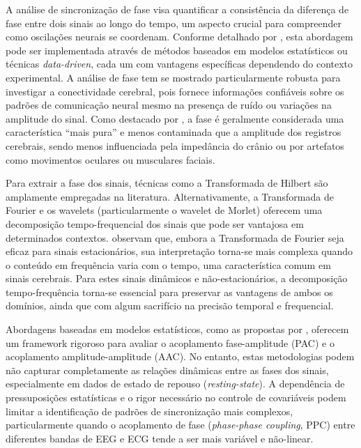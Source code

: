 A análise de sincronização de fase visa quantificar a consistência da diferença de fase entre dois sinais ao longo do tempo, um aspecto crucial para compreender como oscilações neurais se coordenam. Conforme detalhado por , esta abordagem pode ser implementada através de métodos baseados em modelos estatísticos ou técnicas \textit{data-driven}, cada um com vantagens específicas dependendo do contexto experimental. A análise de fase tem se mostrado particularmente robusta para investigar a conectividade cerebral, pois fornece informações confiáveis sobre os padrões de comunicação neural mesmo na presença de ruído ou variações na amplitude do sinal. Como destacado por , a fase é geralmente considerada uma característica ``mais pura'' e menos contaminada que a amplitude dos registros cerebrais, sendo menos influenciada pela impedância do crânio ou por artefatos como movimentos oculares ou musculares faciais.

Para extrair a fase dos sinais, técnicas como a Transformada de Hilbert são amplamente empregadas na literatura. Alternativamente, a Transformada de Fourier e os wavelets (particularmente o wavelet de Morlet) oferecem uma decomposição tempo-frequencial dos sinais que pode ser vantajosa em determinados contextos.  observam que, embora a Transformada de Fourier seja eficaz para sinais estacionários, sua interpretação torna-se mais complexa quando o conteúdo em frequência varia com o tempo, uma característica comum em sinais cerebrais. Para estes sinais dinâmicos e não-estacionários, a decomposição tempo-frequência torna-se essencial para preservar as vantagens de ambos os domínios, ainda que com algum sacrifício na precisão temporal e frequencial.

Abordagens baseadas em modelos estatísticos, como as propostas por , oferecem um framework rigoroso para avaliar o acoplamento fase-amplitude (PAC) e o acoplamento amplitude-amplitude (AAC). No entanto, estas metodologias podem não capturar completamente as relações dinâmicas entre as fases dos sinais, especialmente em dados de estado de repouso (\textit{resting-state}). A dependência de pressuposições estatísticas e o rigor necessário no controle de covariáveis podem limitar a identificação de padrões de sincronização mais complexos, particularmente quando o acoplamento de fase (\textit{phase-phase coupling}, PPC) entre diferentes bandas de EEG e ECG tende a ser mais variável e não-linear.

